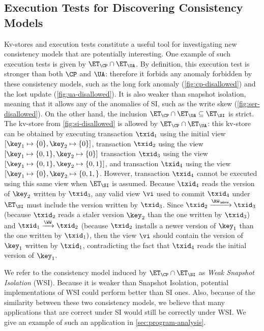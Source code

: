 \subsection{Execution Tests for Discovering Consistency Models}
Kv-stores and execution tests constitute a useful tool for investigating new 
consistency models that are potentially interesting. 
One example of such execution tests is given by 
$\ET_{\CP} \cap \ET_{\UA}$. By definition, this execution 
test is stronger than both $\CP$ and $\UA$: therefore 
it forbids any anomaly forbidden by these consistency models, 
such as the long fork anomaly (\cref{fig:cp-disallowed}) and the lost update (\cref{fig:ua-disallowed}). 
It is also weaker than snapshot isolation, meaning that it allows any of the anomalies 
of SI, such as the write skew (\cref{fig:ser-disallowed}). On the other hand, the inclusion 
$\ET_{\CP} \cap \ET_{\UA} \subseteq \ET_{\SI}$ is strict. The kv-store from  
\cref{fig:si-disallowed} is allowed by $\ET_{\CP} \cap \ET_{\UA}$: 
this kv-store can be obtained by executing  
transaction $\txid_{1}$ using the initial view $[\key_1 \mapsto \{0\}, \key_2 \mapsto \{0\}]$, 
transaction $\txid_{2}$ using the view $[\key_1 \mapsto \{0,1\}, \key_2 \mapsto \{0\}]$ 
transaction $\txid_{3}$ using the view $[\key_1 \mapsto \{0,1\}, \key_2 \mapsto \{0,1\}]$, 
and transaction $\txid_{4}$ using the view $[\key_1 \mapsto \{0\}, \key_2 \mapsto \{0,1,\}$. 
However, transaction $\txid_{4}$ cannot be executed using this same view when $\ET_{\SI}$ is 
assumed. Because $\txid_{4}$ reads the version of $\key_2$ written by $\txid_3$, 
any valid view $\vi$ used to commit $\txid_{4}$ under $\ET_{\SI}$ must include the version written by 
$\txid_{3}$. Since $\txid_{2} \xrightarrow{\RW_{\mkvs}} \txid_{3}$ (because $\txid_{2}$ reads a staler 
version $\key_2$ than the one written by $\txid_{3}$) and $\txid_{1} \xrightarrow{\WW} \txid_{2}$ 
(because $\txid_{2}$ installs a newer version of $\key_{1}$ than the one written by $\txid_{1})$, 
then the view $\vi$ should contain the version of $\key_{1}$ written by $\txid_{1}$, contradicting 
the fact that $\txid_{4}$ reads the initial version of $\key_1$.

We refer to the consistency model induced by $\ET_{\CP} \cap \ET_{\SI}$ as \emph{Weak Snapshot Isolation} (WSI). 
Because it is weaker than Snapshot Isolation, potential implementations of WSI could perform better than SI ones. 
Also, because of the similarity between these two consistency models, we believe that many applications that 
are correct under SI would still be correctly under WSI. We give an example of such an application in \cref{sec:program-analysis}.


